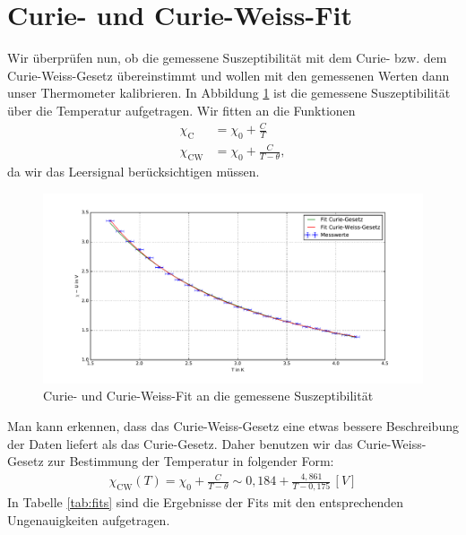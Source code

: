 \documentclass[twoside,colorback,accentcolor=tud4c,11pt]{tudreport}
\begin{document}
\section{Curie- und Curie-Weiss-Fit}
Wir überprüfen nun, ob die gemessene Suszeptibilität mit dem Curie- bzw. dem Curie-Weiss-Gesetz übereinstimmt und wollen mit den gemessenen Werten dann unser Thermometer kalibrieren. In Abbildung \ref{fig:CW} ist die gemessene Suszeptibilität über die Temperatur aufgetragen. Wir fitten an die Funktionen
\begin{align}
\chi_{\text{C}}&=\chi_0+\frac{C}{T}\\
\chi_{\text{CW}}&=\chi_0+\frac{C}{T-\theta},
\end{align}
da wir das Leersignal berücksichtigen müssen.
\begin{figure}[H]
\centering
   	\begin{minipage}[b]{\textwidth}
   	\includegraphics[width=\textwidth]{graphics/chifit.pdf}
   	\caption{Curie- und Curie-Weiss-Fit an die gemessene Suszeptibilität}
  	\label{fig:CW}
   	\end{minipage}
\end{figure}
Man kann erkennen, dass das Curie-Weiss-Gesetz eine etwas bessere Beschreibung der Daten liefert als das Curie-Gesetz. Daher benutzen wir das Curie-Weiss-Gesetz zur Bestimmung der Temperatur in folgender Form:
\begin{align}
\chi_{\text{CW}}(T)=\chi_0+\frac{C}{T-\theta}\sim 0,184+\frac{4,861}{T-0,175}\,[\si{V}]
\end{align}
In Tabelle \ref{tab:fits} sind die Ergebnisse der Fits mit den entsprechenden Ungenauigkeiten aufgetragen.
\end{document}
